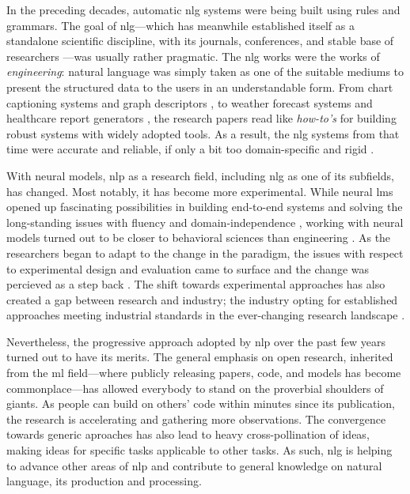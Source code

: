 In the preceding decades, automatic \ac{nlg} systems were being built using rules and grammars. The goal of \ac{nlg}---which has meanwhile established itself as a standalone scientific discipline, with its journals, conferences, and stable base of researchers \cite{ACLanthologySIGGEN}---was usually rather pragmatic.
The \ac{nlg} works were the works of \emph{engineering}: natural language was simply taken as one of the suitable mediums to present the structured data to the users in an understandable form. From chart captioning systems \cite{mittalDescribingComplexCharts1998} and graph descriptors \cite{sunDomainIndependentSentence2006}, to weather forecast systems \cite{belzAutomaticGenerationWeather2008} and healthcare report generators \cite{portetAutomaticGenerationTextual2009}, the research papers read like \emph{how-to's} for building robust systems with widely adopted tools. As a result, the \ac{nlg} systems from that time were accurate and reliable, if only a bit too domain-specific and rigid \cite{reiterBuildingAppliedNatural1997,gattSurveyStateArt2018}.


With neural models, \ac{nlp} as a research field, including \ac{nlg} as one of its subfields, has changed. Most notably, it has become more experimental. While neural \acp{lm} opened up fascinating possibilities in building end-to-end systems and solving the long-standing issues with fluency and domain-independence \cite{ferreiraNeuralDatatotextGeneration2019,dusekEvaluatingStateoftheartEndtoEnd2020,sharmaInnovationsNeuralDatatotext2022}, working with neural models turned out to be closer to behavioral sciences than engineering \cite{holtzmanGenerativeModelsComplex2023}. As the researchers began to adapt to the change in the paradigm, the issues with respect to experimental design and evaluation came to surface \cite{gehrmannRepairingCrackedFoundation2022} and the change was percieved as a step back \cite{reiter2020academic}. The shift towards experimental approaches has also created a gap between research and industry; the industry opting for established approaches meeting industrial standards in the ever-changing research landscape
% 
\cite{daleNaturalLanguageGeneration2020,daleNavigatingTextGeneration2023}.


Nevertheless, the progressive approach adopted by \ac{nlp} over the past few years turned out to have its merits. The general emphasis on open research, inherited from the \ac{ml} field---where publicly releasing papers, code, and models has become commonplace---has allowed everybody to stand on the proverbial shoulders of giants. As people can build on others' code within minutes since its publication, the research is accelerating and gathering more observations. The convergence towards generic aproaches has also lead to heavy cross-pollination of ideas, making ideas for specific tasks applicable to other tasks. As such, \ac{nlg} is helping to advance other areas of \ac{nlp} and contribute to general knowledge on natural language, its production and processing.

